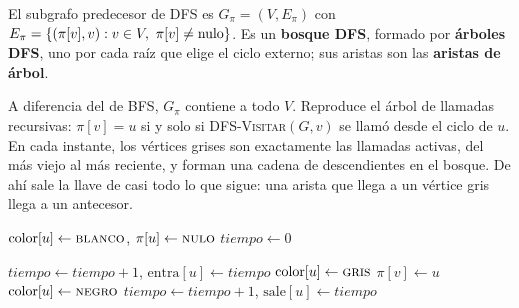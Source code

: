 \documentclass[11pt,letterpaper]{article}
\begin{document}
\begin{definicion}
  El subgrafo predecesor de DFS es $G_\pi = (V, E_\pi)$ con
  $E_\pi = \set{(\pi[v], v) : v \in V,\ \pi[v] \neq \text{nulo}}$.
  Es un \textbf{bosque DFS}, formado por \textbf{árboles DFS}, uno
  por cada raíz que elige el ciclo externo; sus aristas son las
  \textbf{aristas de árbol}.
\end{definicion}

A diferencia del de BFS, $G_\pi$ contiene a todo $V$. Reproduce el
árbol de llamadas recursivas: $\pi[v] = u$ si y solo si
\textsc{DFS-Visitar}$(G, v)$ se llamó desde el ciclo de $u$. En cada
instante, los vértices grises son exactamente las llamadas activas,
del más viejo al más reciente, y forman una cadena de descendientes en
el bosque. De ahí sale la llave de casi todo lo que sigue: una arista
que llega a un vértice gris llega a un antecesor.

\begin{algorithm}[H]
\caption{\textsc{DFS}$(G)$ con colores y tiempos (Cormen, sección
  22.3)}
\label{alg:dfs-tiempos}
\begin{algorithmic}[1]
    \State $\text{color}[u] \gets \textsc{blanco}$, \quad
           $\pi[u] \gets \textsc{nulo}$
  \EndFor
  \State $\mathit{tiempo} \gets 0$
      \State {}
    \EndIf
  \EndFor
\EndProcedure
\end{algorithmic}
\end{algorithm}

\begin{algorithm}[H]
\caption{\textsc{DFS-Visitar}$(G, u)$, la visita recursiva de
  \textsc{DFS}}
\label{alg:busq-dfs-visitar}
\begin{algorithmic}[1]
  \State $\mathit{tiempo} \gets \mathit{tiempo} + 1$, \quad
         $\text{entra}[u] \gets \mathit{tiempo}$
  \State $\text{color}[u] \gets \textsc{gris}$
   
      \State $\pi[v] \gets u$
      \State {}
    \EndIf
  \EndFor
  \State $\text{color}[u] \gets \textsc{negro}$ 
  \State $\mathit{tiempo} \gets \mathit{tiempo} + 1$, \quad
         $\text{sale}[u] \gets \mathit{tiempo}$
\EndProcedure
\end{algorithmic}
\end{algorithm}
\end{document}
